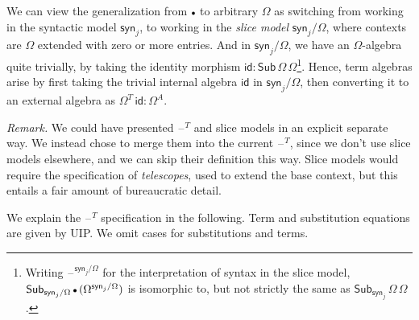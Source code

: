 \documentclass[12pt,a4paper,twoside,openany]{book}
\theoremstyle{remark}
\theoremstyle{definition}
\theoremstyle{theorem}
\newcommand{\id}{\mathsf{id}}
\newcommand{\Sub}{\mathsf{Sub}}
\newcommand{\blank}{\mathord{\hspace{1pt}\text{--}\hspace{1pt}}}
\newcommand{\emptycon}{\scaleobj{.75}\bullet}
\newcommand{\syn}{\mathsf{syn}}
\begin{document}
We can view the generalization from $\emptycon$ to arbitrary $\Omega$ as
switching from working in the syntactic model $\syn_j$, to working in the
\emph{slice model} $\syn_j/\Omega$, where contexts are $\Omega$ extended with
zero or more entries. And in $\syn_j/\Omega$, we have an $\Omega$-algebra quite
trivially, by taking the identity morphism $\id :
\Sub\,\Omega\,\Omega$\footnote{Writing $\blank^{\syn_j/\Omega}$ for the interpretation
of syntax in the slice model,
$\Sub_{\syn_j/\Omega}\,\emptycon\,(\Omega^{\syn_j/\Omega})$ is isomorphic to, but not
strictly the same as $\Sub_{\syn_j}\,\Omega\,\Omega$.}. Hence, term algebras
arise by first taking the trivial internal algebra $\id$ in $\syn_j/\Omega$,
then converting it to an external algebra as $\Omega^T\,\id : \Omega^A$.

\emph{Remark.} We could have presented $\blank^T$ and slice models in an
explicit separate way. We instead chose to merge them into the current
$\blank^T$, since we don't use slice models elsewhere, and we can skip their
definition this way. Slice models would require the specification of
\emph{telescopes}, used to extend the base context, but this entails a fair
amount of bureaucratic detail.

We explain the $\blank^T$ specification in the following. Term and substitution
equations are given by UIP. We omit cases for substitutions and terms.
\end{document}
